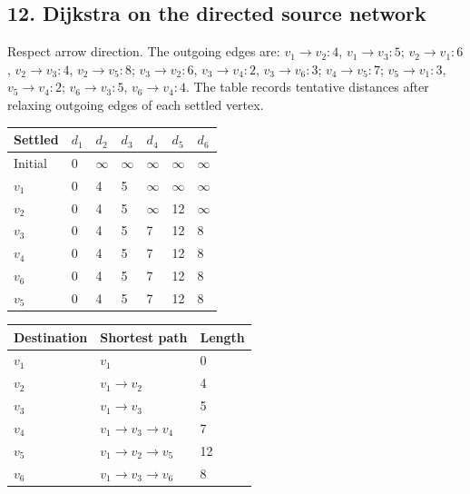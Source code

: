 \documentclass[11pt,a4paper]{article}
\begin{document}
\noindent\begin{minipage}{\linewidth}\subsection*{12. Dijkstra on the directed source network}

Respect arrow direction. The outgoing edges are:
$v_1\to v_2:4$, $v_1\to v_3:5$;
$v_2\to v_1:6$, $v_2\to v_3:4$, $v_2\to v_5:8$;
$v_3\to v_2:6$, $v_3\to v_4:2$, $v_3\to v_6:3$;
$v_4\to v_5:7$;
$v_5\to v_1:3$, $v_5\to v_4:2$;
$v_6\to v_3:5$, $v_6\to v_4:4$.
The table records tentative distances after relaxing outgoing edges of each settled vertex.
\begin{center}\renewcommand{\arraystretch}{1.2}\begin{tabular}{lllllll}\hline Settled & $d_1$ & $d_2$ & $d_3$ & $d_4$ & $d_5$ & $d_6$\\\hline
Initial & 0 & $\infty$ & $\infty$ & $\infty$ & $\infty$ & $\infty$\\
$v_1$ & 0 & 4 & 5 & $\infty$ & $\infty$ & $\infty$\\
$v_2$ & 0 & 4 & 5 & $\infty$ & 12 & $\infty$\\
$v_3$ & 0 & 4 & 5 & 7 & 12 & 8\\
$v_4$ & 0 & 4 & 5 & 7 & 12 & 8\\
$v_6$ & 0 & 4 & 5 & 7 & 12 & 8\\
$v_5$ & 0 & 4 & 5 & 7 & 12 & 8\\\hline\end{tabular}\end{center}\begin{center}\renewcommand{\arraystretch}{1.2}\begin{tabular}{lll}\hline Destination & Shortest path & Length\\\hline
$v_1$ & $v_1$ & 0\\
$v_2$ & $v_1\to v_2$ & 4\\
$v_3$ & $v_1\to v_3$ & 5\\
$v_4$ & $v_1\to v_3\to v_4$ & 7\\
$v_5$ & $v_1\to v_2\to v_5$ & 12\\
$v_6$ & $v_1\to v_3\to v_6$ & 8\\\hline\end{tabular}\end{center}
\end{minipage}\par\medskip
\end{document}

